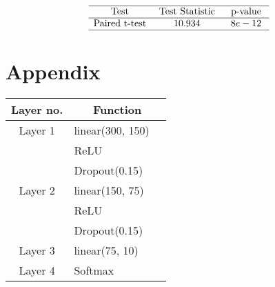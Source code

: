 \documentclass{article}
\begin{document}
\begin{equation}
\begin{array}{ccc}
\hline \text { Test } & {\text { Test Statistic }} & {\text { p-value }} \\
\hline \text {Paired t-test} & {10.934} & {8e-12} \\
\hline
\end{array}
\end{equation}

\section{Appendix}
\begin{tabular}[H]{c l @{} l}
\centering
Layer no.       &
\multicolumn{2}{c}{Function} \\
\hline
Layer 1     & linear(300, 150) \\
            & ReLU \\
            & Dropout(0.15) \\
Layer 2     & linear(150, 75) \\ 
            & ReLU \\
            & Dropout(0.15) \\
Layer 3     & linear(75, 10) \\ 
Layer 4     & Softmax\\ 
\end{tabular}\\ 
\end{document}
